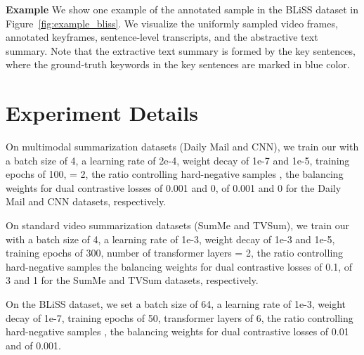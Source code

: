 \vspace{0.05in} 
\noindent\textbf{Example}
We show one example of the annotated sample in the BLiSS dataset in Figure~\ref{fig:example_bliss}. We visualize the uniformly sampled video frames, annotated keyframes, sentence-level transcripts, and the abstractive text summary. Note that the extractive text summary is formed by the key sentences, where the ground-truth keywords in the key sentences are marked in blue color.
\begin{figure*}[t]
\vspace{-0.1in}
\centering
    \vspace{-0.25in}
    \caption{Example of one data sample from the BLiSS dataset. Here, we visualize the uniformly sampled video frames, annotated keyframes, sentence-level transcript, and abstractive text summary. Note that the extractive text summary is formed by the key sentences, where the ground-truth keywords are marked with \textcolor{-red!70!green}{blue} color. Best viewed in color.}
\vspace{-0.15in}
\label{fig:example_bliss}
\end{figure*}



\section{Experiment Details}
\vspace{-0.05in}
\label{sec:experiment_details}
On multimodal summarization datasets (Daily Mail and CNN), we train our \system with a batch size of 4, a learning rate of 2e-4, weight decay of 1e-7 and 1e-5, training epochs of 100,   = 2, the ratio controlling hard-negative samples , the balancing weights for dual contrastive losses  of 0.001 and 0,  of 0.001 and 0 for the Daily Mail and CNN datasets, respectively. 

On standard video summarization datasets (SumMe and TVSum), we train our \system with a batch size of 4, a learning rate of 1e-3, weight decay of 1e-3 and 1e-5, training epochs of 300, number of transformer layers  = 2, the ratio controlling hard-negative samples  the balancing weights for dual contrastive losses  of 0.1,  of 3 and 1 for the SumMe and TVSum datasets, respectively.

On the BLiSS dataset, we set a batch size of 64, a learning rate of 1e-3, weight decay of 1e-7, training epochs of 50, transformer layers  of 6, the ratio controlling hard-negative samples , the balancing weights for dual contrastive losses  of 0.01 and  of 0.001.

